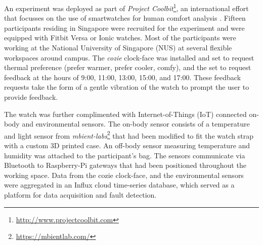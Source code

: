 
An experiment was deployed as part of \emph{Project Coolbit}\footnote{\url{http://www.projectcoolbit.com}}, an international effort that focusses on the use of smartwatches for human comfort analysis \cite{nazarian2019geophysics}. Fifteen participants residing in Singapore were recruited for the experiment and were equipped with Fitbit Versa or Ionic watches. Most of the participants were working at the National University of Singapore (NUS) at several flexible workspaces around campus.  The \emph{cozie} clock-face was installed and set to request thermal preference (prefer warmer, prefer cooler, comfy), and the set to request feedback at the hours of 9:00, 11:00, 13:00, 15:00, and 17:00. These feedback requests take the form of a gentle vibration of the watch to prompt the user to provide feedback.

The watch was further complimented with Internet-of-Things (IoT) connected on-body and environmental sensors. The on-body sensor consists of a temperature and light sensor from \emph{mbient-labs}\footnote{\url{https://mbientlab.com/}} that had been modified to fit the watch strap with a custom 3D printed case. An off-body sensor measuring temperature and humidity was attached to the participant's bag. The sensors communicate via Bluetooth to Raspberry-Pi gateways that had been positioned throughout the working space. Data from the cozie clock-face, and the environmental sensors were aggregated in an Influx cloud time-series database, which served as a platform for data acquisition and fault detection. 



